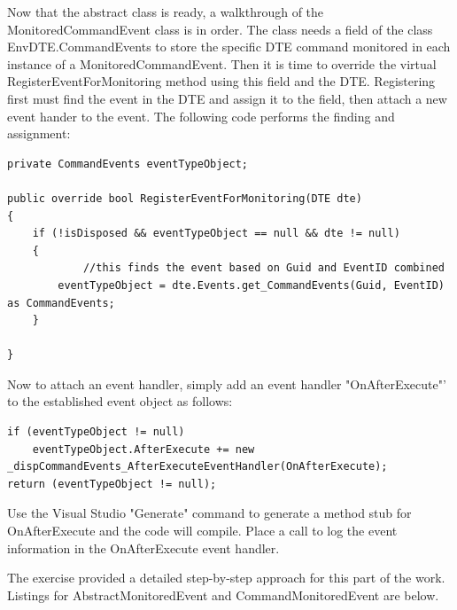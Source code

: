 \begin{Exercise}
Now that the abstract class is ready, a walkthrough of the MonitoredCommandEvent class is in order.  The class needs a field of the class EnvDTE.CommandEvents to store the specific DTE command monitored in each instance of a MonitoredCommandEvent.  Then it is time to override the virtual RegisterEventForMonitoring method using this field and the DTE.  Registering first must find the event in the DTE and assign it to the field, then attach a new event hander to the event.  The following code performs the finding and assignment:

\begin{lstlisting}
private CommandEvents eventTypeObject;

public override bool RegisterEventForMonitoring(DTE dte)
{
    if (!isDisposed && eventTypeObject == null && dte != null)
    {
    		//this finds the event based on Guid and EventID combined
        eventTypeObject = dte.Events.get_CommandEvents(Guid, EventID) as CommandEvents;
    }
		
}
\end{lstlisting}

Now to attach an event handler, simply add an event handler "OnAfterExecute"' to the established event object as follows:
\begin{lstlisting}
if (eventTypeObject != null) 
	eventTypeObject.AfterExecute += new _dispCommandEvents_AfterExecuteEventHandler(OnAfterExecute);
return (eventTypeObject != null);
\end{lstlisting}              

Use the Visual Studio "Generate" command to generate a method stub for OnAfterExecute and the
code will compile.  Place a call to log the event information in the OnAfterExecute event handler.

\end{Exercise}

\begin{Answer}
The exercise provided a detailed step-by-step approach for this part of the work.  Listings for AbstractMonitoredEvent and CommandMonitoredEvent are below.

%

%

\end{Answer}


